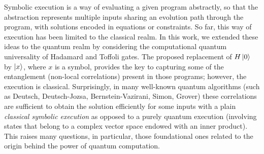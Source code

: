 \documentclass[sigplan,review]{acmart}
\begin{document}
Symbolic execution is a way of evaluating a given program abstractly,
so that the abstraction represents multiple inputs sharing an
evolution path through the program, with solutions encoded in
equations or constraints. So far, this way of execution has been
limited to the classical realm. In this work, we extended these ideas
to the quantum realm by considering the computational quantum
universality of Hadamard and Toffoli gates. The proposed replacement
of $H \ket{0}$ by $\ket{x}$, where $x$ is a symbol, provides the key
to capturing some of the entanglement (non-local correlations) present
in those programs; however, the execution is classical. Surprisingly,
in many well-known quantum algorithms (such as Deutsch, Deutsch-Jozsa,
Bernstein-Vazirani, Simon, Grover) these correlations are sufficient
to obtain the solution efficiently for some inputs with a plain
\emph{classical symbolic execution} as opposed to a purely quantum
execution (involving states that belong to a complex vector space
endowed with an inner product). This raises many questions, in
particular, those foundational ones related to the origin behind the
power of quantum computation.
\end{document}
